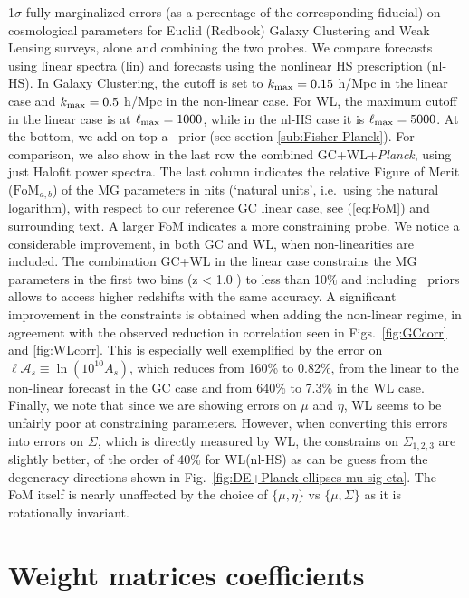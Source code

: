 \begin{table}
{1$\sigma$
fully marginalized errors (as a percentage of the corresponding fiducial) on cosmological parameters for Euclid (Redbook) Galaxy Clustering and Weak Lensing surveys, alone and combining the two probes. We compare forecasts using linear spectra (lin) and forecasts using the nonlinear HS prescription (nl-HS). In Galaxy Clustering, the cutoff is set to $k_{\rm max}=0.15$ h/Mpc in the linear case and $k_{\rm max}=0.5$ h/Mpc in the non-linear case.
For WL, the maximum cutoff in the linear case is at $\ell_{\rm max} = 1000$, 
while in the nl-HS case it is $\ell_{\rm max} = 5000$.
At the bottom, we add on top a \planck\ prior (see section \ref{sub:Fisher-Planck}).
For comparison, we also show in the last row the combined GC+WL+{\it Planck}, using just Halofit power spectra. 
The last column indicates the relative Figure of Merit ($\text{FoM}_{a,b}$) of the MG parameters in nits (`natural units', i.e.\ using the natural logarithm), with respect to our reference GC linear case, see (\ref{eq:FoM}) and surrounding text. A larger FoM indicates a more constraining probe. We notice a considerable improvement, in both GC and WL, when non-linearities are included.
The combination GC+WL in the linear case 
constrains the MG parameters in the first two bins (z < 1.0 ) to less than 10$\%$ and including \planck\ priors allows to access higher redshifts with the same accuracy. A significant improvement in the constraints is obtained when adding the non-linear regime, in agreement with the observed reduction in correlation seen in Figs.\ \ref{fig:GCcorr} and \ref{fig:WLcorr}. This is especially well exemplified by the error on $\ell \mathcal{A}_s \equiv \ln(10^{10} A_{s})$, which reduces from 160\%  to 0.82\%, from the linear to the non-linear forecast in the GC case
and from 640\%  to 7.3\% in the WL case. 
Finally, we note that since we are showing errors on $\mu$ and $\eta$, WL seems to be unfairly poor at constraining parameters. However, when converting this errors into errors on $\Sigma$, which is directly measured by WL, the constrains on $\Sigma_{1,2,3}$ are slightly better, of the order of 40\% for WL(nl-HS) as can be guess from the degeneracy directions shown in Fig.\ \ref{fig:DE+Planck-ellipses-mu-sig-eta}. The FoM itself is nearly unaffected by the choice of $\{\mu,\eta\}$ vs $\{\mu,\Sigma\}$ as it is rotationally invariant.
}
\end{table}
\normalsize

\section{Weight matrices coefficients}
\label{sec:Wmatrices}

